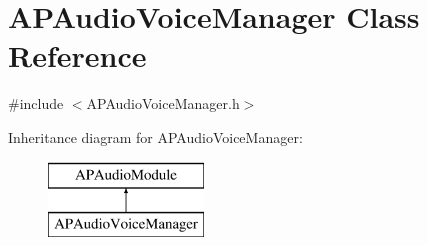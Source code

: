 \hypertarget{class_a_p_audio_voice_manager}{\section{A\+P\+Audio\+Voice\+Manager Class Reference}
\label{class_a_p_audio_voice_manager}
}


{\ttfamily \#include $<$A\+P\+Audio\+Voice\+Manager.\+h$>$}

Inheritance diagram for A\+P\+Audio\+Voice\+Manager\+:\begin{figure}[H]
\begin{center}
\leavevmode
\includegraphics[height=2.000000cm]{class_a_p_audio_voice_manager}
\end{center}
\end{figure}
